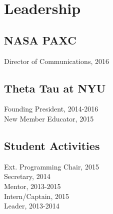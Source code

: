 \documentclass[]{deedy-resume-openfont}
\begin{document}
\begin{minipage}[t]{0.33\textwidth}
%


\section{Leadership}

\subsection{NASA PAXC}
Director of Communications, 2016\\
\sectionsep

\subsection{Theta Tau at NYU}

Founding President, 2014-2016 \\
New Member Educator, 2015 \\
\sectionsep

\subsection{Student Activities}
Ext. Programming Chair, 2015\\
Secretary, 2014 \\
Mentor, 2013-2015\\
Intern/Captain, 2015\\
Leader, 2013-2014
\sectionsep


\end{minipage}
\end{document}

